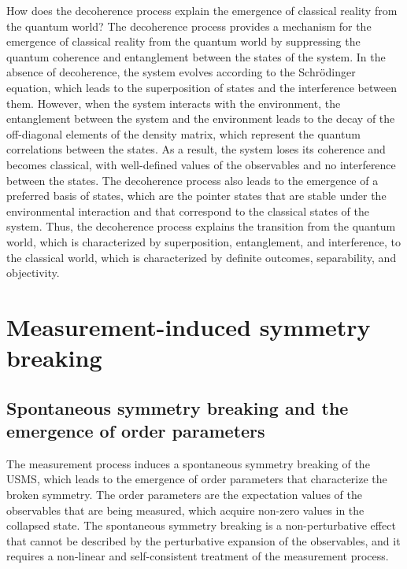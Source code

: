 \begin{tcolorbox}[colback=green!5!white,colframe=green!75!black,title=Question]
    How does the decoherence process explain the emergence of classical reality from the quantum world?
    \tcblower
    The decoherence process provides a mechanism for the emergence of classical reality from the quantum world by suppressing the quantum coherence and entanglement between the states of the system. In the absence of decoherence, the system evolves according to the Schrödinger equation, which leads to the superposition of states and the interference between them. However, when the system interacts with the environment, the entanglement between the system and the environment leads to the decay of the off-diagonal elements of the density matrix, which represent the quantum correlations between the states. As a result, the system loses its coherence and becomes classical, with well-defined values of the observables and no interference between the states. The decoherence process also leads to the emergence of a preferred basis of states, which are the pointer states that are stable under the environmental interaction and that correspond to the classical states of the system. Thus, the decoherence process explains the transition from the quantum world, which is characterized by superposition, entanglement, and interference, to the classical world, which is characterized by definite outcomes, separability, and objectivity.
\end{tcolorbox}

\section{Measurement-induced symmetry breaking}
\subsection{Spontaneous symmetry breaking and the emergence of order parameters}
The measurement process induces a spontaneous symmetry breaking of the USMS, which leads to the emergence of order parameters that characterize the broken symmetry. The order parameters are the expectation values of the observables that are being measured, which acquire non-zero values in the collapsed state. The spontaneous symmetry breaking is a non-perturbative effect that cannot be described by the perturbative expansion of the observables, and it requires a non-linear and self-consistent treatment of the measurement process.

